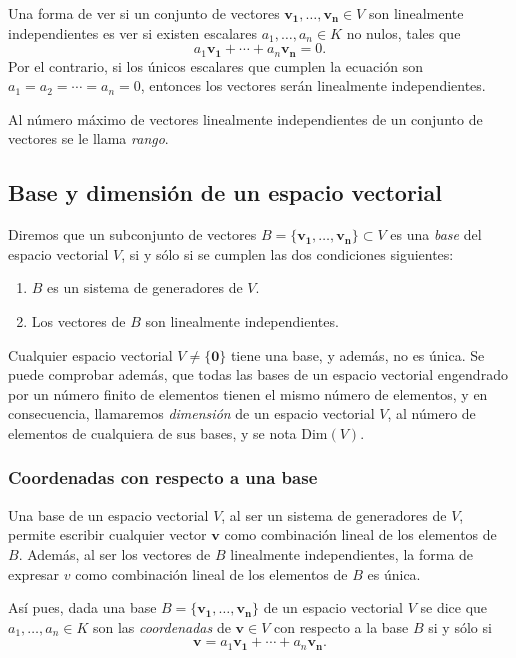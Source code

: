 \documentclass[a4paper]{article}
\begin{document}
Una forma de ver si un conjunto de vectores $\mathbf{v_1},\ldots,\mathbf{v_n}\in V$ son linealmente independientes es ver si existen escalares $a_1,\ldots,a_n\in K$ no nulos, tales que
\[a_1\mathbf{v_1}+\cdots+ a_n\mathbf{v_n}=0.\]
Por el contrario, si los únicos escalares que cumplen la ecuación son $a_1=a_2=\cdots=a_n=0$, entonces los vectores serán linealmente independientes.

Al número máximo de vectores linealmente independientes de un conjunto de vectores se le llama \emph{rango}.

\subsection*{Base y dimensión de un espacio vectorial}
Diremos que un subconjunto de vectores $B=\{\mathbf{v_1},\ldots,\mathbf{v_n}\}\subset V$ es una \emph{base} del espacio vectorial $V$, si y sólo si se cumplen las dos condiciones siguientes:
\begin{enumerate}
\item $B$ es un sistema de generadores de $V$.
\item Los vectores de $B$ son linealmente independientes.
\end{enumerate}

Cualquier espacio vectorial $V\neq\{\mathbf{0}\}$ tiene una base, y además, no es única.
Se puede comprobar además, que todas las bases de un espacio vectorial  engendrado por un número finito de elementos tienen el mismo número de elementos, y en consecuencia, llamaremos \emph{dimensión} de un espacio vectorial $V$, al número de elementos de cualquiera de sus bases, y se nota $\textrm{Dim}(V)$.

\subsubsection*{Coordenadas con respecto a una base}
Una base de un espacio vectorial $V$, al ser un sistema de generadores de $V$, permite escribir cualquier vector $\mathbf{v}$ como combinación lineal de los elementos de $B$. Además, al ser los vectores de $B$ linealmente independientes, la forma de expresar $v$ como combinación lineal de los elementos de $B$ es única.

Así pues, dada una base $B=\{\mathbf{v_1},\ldots,\mathbf{v_n}\}$ de un espacio vectorial $V$ se dice que $a_1,\ldots,a_n\in K$ son las \emph{coordenadas} de $\mathbf{v}\in V$ con respecto a la base $B$ si y sólo si
\[\mathbf{v }= a_1\mathbf{v_1}+\cdots+ a_n\mathbf{v_n}.\]
\end{document}
